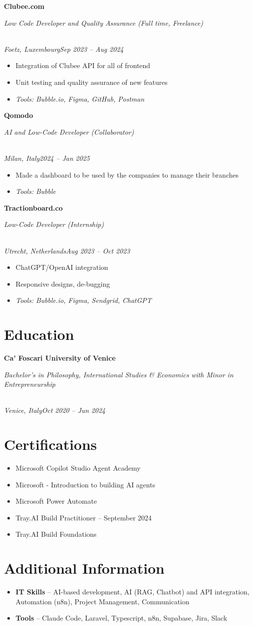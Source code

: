 \documentclass[a4paper,10pt]{article}
\newcommand{\role}[4]{\vspace{3pt}\noindent\hspace{0.6em}\parbox[t]{0.38\textwidth}{\raggedright\textbf{#1}}\hfill\parbox[t]{0.58\textwidth}{\raggedleft\textit{#2}}\\{\textit{#3}\hfill\textit{#4}}\vspace{1pt}}
\begin{document}
\role{Clubee.com}{Low Code Developer and Quality Assurance (Full time, Freelance)}{Foetz, Luxembourg}{Sep 2023 -- Aug 2024}
\begin{itemize}
\item Integration of Clubee API for all of frontend
\item Unit testing and quality assurance of new features
\item \textit{Tools: Bubble.io, Figma, GitHub, Postman}
\end{itemize}

\role{Qomodo}{AI and Low-Code Developer (Collaborator)}{Milan, Italy}{2024 -- Jan 2025}
\begin{itemize}
\item Made a dashboard to be used by the companies to manage their branches
\item \textit{Tools: Bubble}
\end{itemize}

\role{Tractionboard.co}{Low-Code Developer (Internship)}{Utrecht, Netherlands}{Aug 2023 -- Oct 2023}
\begin{itemize}
\item ChatGPT/OpenAI integration
\item Responsive designs, de-bugging
\item \textit{Tools: Bubble.io, Figma, Sendgrid, ChatGPT}
\end{itemize}

\section{Education}
\role{Ca' Foscari University of Venice}{Bachelor's in Philosophy, International Studies \& Economics with Minor in Entrepreneurship}{Venice, Italy}{Oct 2020 -- Jun 2024}

\section{Certifications}
\begin{itemize}
\item Microsoft Copilot Studio Agent Academy
\item Microsoft - Introduction to building AI agents
\item Microsoft Power Automate
\item Tray.AI Build Practitioner -- September 2024
\item Tray.AI Build Foundations
\end{itemize}

\section{Additional Information}
\begin{itemize}
\item \textbf{IT Skills} -- AI-based development, AI (RAG, Chatbot) and API integration, Automation (n8n), Project Management, Communication
\item \textbf{Tools} -- Claude Code, Laravel, Typescript, n8n, Supabase, Jira, Slack
\end{itemize}
\end{document}
